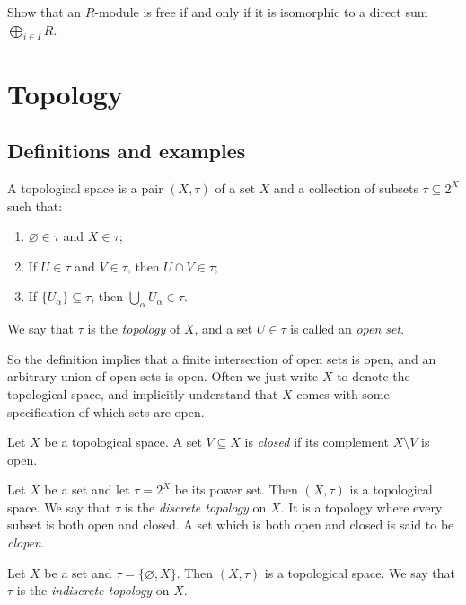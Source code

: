 \documentclass[a4paper,11pt]{article}
\begin{document}
    \begin{exercise}
      Show that an \(R\)-module is free if and only if it is isomorphic to a direct sum \(\bigoplus_{i \in I} R\).
    \end{exercise}

    \section{Topology}
    \subsection{Definitions and examples}
    \begin{definition}
      A topological space is a pair \((X, \tau)\) of a set \(X\) and a collection of subsets \(\tau \subseteq 2^X\) such that:
      \begin{enumerate}[label=(\roman*)]
        \item \(\varnothing \in \tau\) and \(X \in \tau\);
        \item If \(U \in \tau\) and \(V \in \tau\), then \(U \cap V \in \tau\);
        \item If \(\{U_\alpha\} \subseteq \tau\), then \(\bigcup_\alpha U_\alpha \in \tau\).
      \end{enumerate}
      We say that \(\tau\) is the \emph{topology} of \(X\), and a set \(U \in \tau\) is called an \emph{open set}.
    \end{definition}
    So the definition implies that a finite intersection of open sets is open, and an arbitrary union of open sets is open. Often we just write \(X\) to denote the topological space, and implicitly understand that \(X\) comes with some specification of which sets are open.

    \begin{definition}
      Let \(X\) be a topological space. A set \(V \subseteq X\) is \emph{closed} if its complement \(X \setminus V\) is open.
    \end{definition}

    \begin{example}
      Let \(X\) be a set and let \(\tau = 2^X\) be its power set. Then \((X, \tau)\) is a topological space. We say that \(\tau\) is the \emph{discrete topology} on \(X\). It is a topology where every subset is both open and closed. A set which is both open and closed is said to be \emph{clopen}.
    \end{example}

    \begin{example}
      Let \(X\) be a set and \(\tau = \{\varnothing, X\}\). Then \((X, \tau)\) is a topological space. We say that \(\tau\) is the \emph{indiscrete topology} on \(X\).
    \end{example}
\end{document}
